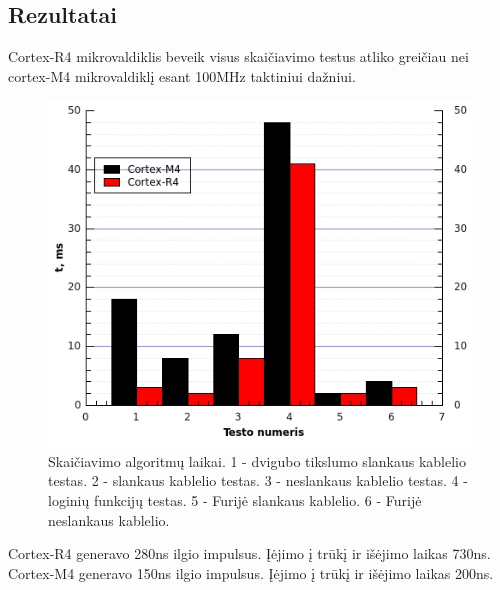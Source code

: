 \documentclass[a4paper, 12pt]{article} %
\begin{document}
\begin{onehalfspacing}
\newpage
   
\section{Rezultatai}
Cortex-R4 mikrovaldiklis beveik visus skai\v{c}iavimo testus atliko grei\v{c}iau nei cortex-M4 mikrovaldikl\k{i} esant 100MHz taktiniui da\v{z}niui. 
\begin{figure}[H] %
\centering %
\includegraphics[scale=0.8]{pav/testai.jpg} %
\captionsetup{labelformat=numbfirst} %
\captionsetup{labelseparator=tarpas}
\caption{Skai\v{c}iavimo algoritm\k{u} laikai. 1 - dvigubo tikslumo slankaus kablelio testas. 2 - slankaus kablelio testas. 3 - neslankaus kablelio testas. 4 - logini\k{u} funkcij\k{u} testas. 5 - Furij\.e slankaus kablelio. 6 - Furij\.e neslankaus kablelio.}
\label{vienas}
\end{figure}
Cortex-R4 generavo 280ns ilgio impulsus. \k{I}\.ejimo \k{i} tr\=uk\k{i} ir i\v{s}\.ejimo laikas 730ns. Cortex-M4 generavo 150ns ilgio impulsus. \k{I}\.ejimo \k{i} tr\=uk\k{i} ir i\v{s}\.ejimo laikas 200ns.
\begin{figure}[H] %

\end{figure}
\end{onehalfspacing}
\end{document}
